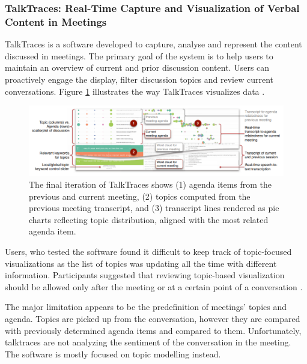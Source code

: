 \documentclass{article}
\begin{document}
\subsubsection{TalkTraces: Real-Time Capture and Visualization of Verbal Content in Meetings}
{\large 
TalkTraces is a software developed to capture, analyse and represent the content discussed in meetings. The primary goal of the system is to help users to maintain an overview of current and prior discussion content. Users can proactively engage the display, filter discussion topics and review current conversations. Figure \ref{fig:talktraces} illustrates the way TalkTraces visualizes data \parencite{talktraces}.\par
}

\begin{figure}[H]
  \centering
  \includegraphics[scale=0.6]{img/talktraces.png}
  \caption{The final iteration of TalkTraces shows (1) agenda items from the previous and current meeting, (2) topics computed from the previous meeting transcript, and (3) transcript lines rendered as pie charts reflecting topic distribution, aligned with the most related agenda item.}
  \label{fig:talktraces}
\end{figure}

{\large 
Users, who tested the software found it difficult to keep track of topic-focused visualizations as the list of topics was updating all the time with different information. Participants suggested that reviewing topic-based visualization should be allowed only after the meeting or at a certain point of a conversation \parencite{talktraces}.\par
}

{\large 
The major limitation appears to be the predefinition of meetings' topics and agenda. Topics are picked up from the conversation, however they are compared with previously determined agenda items and compared to them. Unfortunately, talktraces are not analyzing the sentiment of the conversation in the meeting. The software is mostly focused on topic modelling instead.\par
}
\end{document}
